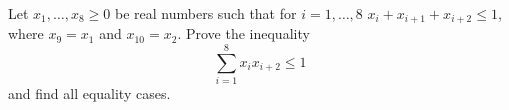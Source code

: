 Let $x_1,\dots,x_{8}\ge 0$ be real numbers such that for $i=1,\dots, 8$ $x_{i}+x_{i+1}+x_{i+2}\le 1$,
where $x_{9}=x_{1}$ and $x_{10}=x_2$. Prove the inequality
$$\sum_{i=1}^{8}x_{i}x_{i+2}\le 1$$
and find all equality cases.